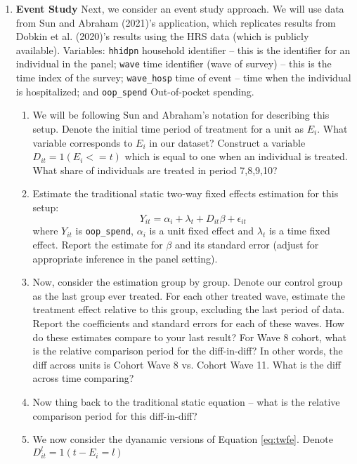 \documentclass[11pt, a4paper]{article}
\begin{document}
\begin{enumerate}
\item\textbf{Event Study} Next, we consider an event study
  approach. We will use data from Sun and Abraham (2021)'s
  application, which replicates results from Dobkin et al. (2020)'s
  results using the HRS data (which is publicly available). Variables:
  \texttt{hhidpn} household identifier -- this is the identifier for
  an individual in the panel; \texttt{wave} time identifier (wave of
  survey) -- this is the time index of the survey; \texttt{wave\_hosp}
  time of event -- time when the individual is hospitalized; and
  \texttt{oop\_spend} Out-of-pocket spending.
  \begin{enumerate}
  \item We will be following Sun and Abraham's notation for describing
    this setup. Denote the initial time period of treatment for a unit
    as $E_{i}$. What variable corresponds to $E_{i}$ in our dataset?
    Construct a variable $D_{it} = 1(E_{i} <= t)$ which is equal to
    one when an individual is treated. What share of individuals are
    treated in period 7,8,9,10?
  \item Estimate the traditional static two-way fixed effects
    estimation for this setup:
    \begin{equation}\label{eq:twfe}
      Y_{it} = \alpha_{i} + \lambda_{t} + D_{it}\beta + \epsilon_{it}
    \end{equation}
    where $Y_{it}$ is \texttt{oop\_spend}, $\alpha_{i}$ is a unit
    fixed effect and $\lambda_{t}$ is a time fixed effect. Report the
    estimate for $\beta$ and its standard error (adjust for
    appropriate inference in the panel setting). 
  \item Now, consider the estimation group by group. Denote our
    control group as the last group ever treated. For each other
    treated wave, estimate the treatment effect relative to this
    group, excluding the last period of data. Report the coefficients
    and standard errors for each of these waves. How do these
    estimates compare to your last result? For Wave 8 cohort, what is the
    relative comparison period for the diff-in-diff? In other words,
    the diff across units is Cohort Wave 8 vs. Cohort Wave 11. What is the diff
    across time comparing?
  \item Now thing back to the traditional static equation -- what is
    the relative comparison period for this diff-in-diff? 
  \item We now consider the dyanamic versions of Equation
    \ref{eq:twfe}. Denote $D_{it}^{l} = 1(t - E_{i} = l)$

\end{enumerate}
\end{enumerate}
\end{document}
